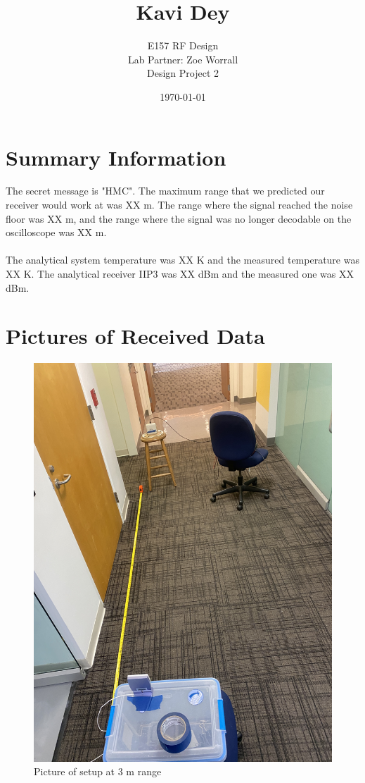 \documentclass[letterpaper,12pt]{article}
\begin{document}
\title{\vspace{-2cm} Kavi Dey}
\author{\vspace{-0.4cm} E157 RF Design \\ Lab Partner: Zoe Worrall \\ Design Project 2}
\date{\vspace{-0.4cm} \today}
\maketitle



\section{Summary Information}
The secret message is "HMC". The maximum range that we predicted our receiver would work at was XX m.
The range where the signal reached the noise floor was XX m, and the range where the signal was no longer decodable on the oscilloscope was XX m.
\\
\\
\noindent
The analytical system temperature was XX K and the measured temperature was XX K. The analytical receiver IIP3 was XX dBm and the measured one was XX dBm.

\newpage
\section{Pictures of Received Data}
\begin{figure}[H]
	\begin{centering}
		\includegraphics[width=0.5\columnwidth,angle=-90]{figures/3m.img}
		\caption{Picture of setup at 3 m range}
	\end{centering}
\end{figure}
\end{document}
